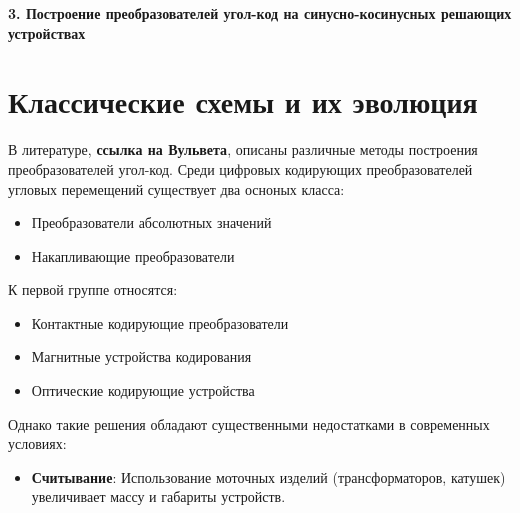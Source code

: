 \newpage
\begin{center}
  \textbf{\large 3. Построение преобразователей угол-код на синусно-косинусных решающих устройствах}
\end{center}


\section{Классические схемы и их эволюция}


В литературе, \textbf{ссылка на Вульвета}, описаны различные методы построения преобразователей угол-код. 
Среди цифровых кодирующих преобразователей угловых перемещений существует два осноных класса: 
\begin{itemize}
  \item Преобразователи абсолютных значений
  \item Накапливающие преобразователи 
\end{itemize}

К первой группе относятся:
\begin{itemize}
  \item Контактные кодирующие преобразователи 
  \item Магнитные устройства кодирования
  \item Оптические кодирующие устройства
\end{itemize}

Однако такие решения обладают существенными недостатками в современных условиях:
\begin{itemize}
  \item \textbf{Считывание}: Использование моточных изделий (трансформаторов, катушек) увеличивает массу и габариты устройств.
\end{itemize}

